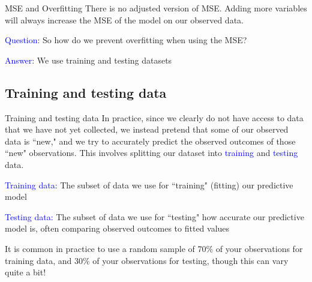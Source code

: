 \documentclass[10pt,t]{beamer}
\begin{document}
\begin{frame}{MSE and Overfitting}
	There is no adjusted version of MSE. Adding more variables will always increase the MSE of the model on our observed data. 
	
	\bigskip
	
	\textcolor{blue}{Question}: So how do we prevent overfitting when using the MSE?
	
	\bigskip
	
	\textcolor{blue}{Answer}: We use training and testing datasets
	

	
\end{frame}



\subsection{Training and testing data}

\begin{frame}{Training and testing data}
	In practice, since we clearly do not have access to data that we have not yet collected, we instead pretend that some of our observed data is ``new," and we try to accurately predict the observed outcomes of those ``new" observations. This involves splitting our dataset into \textcolor{blue}{training} and \textcolor{blue}{testing} data.
	
	\vspace{0.3cm}
	
	\textcolor{blue}{Training data:} The subset of data we use for ``training" (fitting) our predictive model
	
	\vspace{0.3cm}
	
	\textcolor{blue}{Testing data:} The subset of data we use for ``testing" how accurate our predictive model is, often comparing observed outcomes to fitted values
	
	\vspace{0.3cm}
	
	It is common in practice to use a random sample of 70\% of your observations for training data, and 30\% of your observations for testing, though this can vary quite a bit!
	
	
\end{frame}
\end{document}
